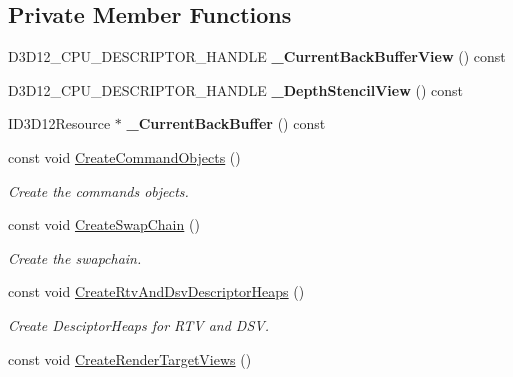 \subsection*{Private Member Functions}
\begin{DoxyCompactItemize}
\item 
D3\+D12\+\_\+\+C\+P\+U\+\_\+\+D\+E\+S\+C\+R\+I\+P\+T\+O\+R\+\_\+\+H\+A\+N\+D\+LE {\bfseries \+\_\+\+Current\+Back\+Buffer\+View} () const \hypertarget{class_ensum_1_1_graphics_1_1_direct3_d12_a901935b6b5ff44e8ae0e640e15aa6eeb}{}\label{class_ensum_1_1_graphics_1_1_direct3_d12_a901935b6b5ff44e8ae0e640e15aa6eeb}

\item 
D3\+D12\+\_\+\+C\+P\+U\+\_\+\+D\+E\+S\+C\+R\+I\+P\+T\+O\+R\+\_\+\+H\+A\+N\+D\+LE {\bfseries \+\_\+\+Depth\+Stencil\+View} () const \hypertarget{class_ensum_1_1_graphics_1_1_direct3_d12_aacc8548cb29544da36fd7f630f1b2432}{}\label{class_ensum_1_1_graphics_1_1_direct3_d12_aacc8548cb29544da36fd7f630f1b2432}

\item 
I\+D3\+D12\+Resource $\ast$ {\bfseries \+\_\+\+Current\+Back\+Buffer} () const \hypertarget{class_ensum_1_1_graphics_1_1_direct3_d12_a4713894e9e589355456707eca90b1491}{}\label{class_ensum_1_1_graphics_1_1_direct3_d12_a4713894e9e589355456707eca90b1491}

\item 
const void \hyperlink{class_ensum_1_1_graphics_1_1_direct3_d12_a07a634e382d491a818b86f247750211f}{Create\+Command\+Objects} ()
\begin{DoxyCompactList}\small\item\em Create the commands objects. \end{DoxyCompactList}\item 
const void \hyperlink{class_ensum_1_1_graphics_1_1_direct3_d12_a70deb180be1a0be106627007f965bb8e}{Create\+Swap\+Chain} ()
\begin{DoxyCompactList}\small\item\em Create the swapchain. \end{DoxyCompactList}\item 
const void \hyperlink{class_ensum_1_1_graphics_1_1_direct3_d12_a8d46f8eb874ef368b441f46772661567}{Create\+Rtv\+And\+Dsv\+Descriptor\+Heaps} ()\hypertarget{class_ensum_1_1_graphics_1_1_direct3_d12_a8d46f8eb874ef368b441f46772661567}{}\label{class_ensum_1_1_graphics_1_1_direct3_d12_a8d46f8eb874ef368b441f46772661567}

\begin{DoxyCompactList}\small\item\em Create Desciptor\+Heaps for R\+TV and D\+SV. \end{DoxyCompactList}\item 
const void \hyperlink{class_ensum_1_1_graphics_1_1_direct3_d12_a9401f92eff74f48b9d3a9249de6c4764}{Create\+Render\+Target\+Views} ()\hypertarget{class_ensum_1_1_graphics_1_1_direct3_d12_a9401f92eff74f48b9d3a9249de6c4764}{}\label{class_ensum_1_1_graphics_1_1_direct3_d12_a9401f92eff74f48b9d3a9249de6c4764}


\end{DoxyCompactItemize}
